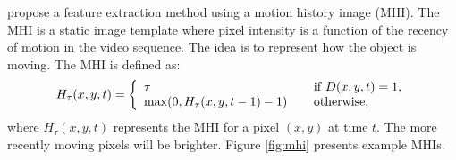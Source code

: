  propose a feature extraction method using
a motion history image (MHI). The MHI is a static image template where pixel
intensity is a function of the recency of motion in the video
sequence. The idea is to represent how the object is moving. The MHI
is defined as:
\[
  \begin{array}{ll}
    H_\tau (x,y,t) = \left\{ 
    \begin{array}{l}
      \tau \\ 
      \max (0, H_\tau (x, y, t - 1) - 1)
    \end{array} \right.
    &
    \begin{array}{l}
      {\rm if}\;D(x, y, t) = 1, \hfill  \\
      {\rm otherwise}, \hfill 
    \end{array}
  \end{array}
\]
where $H_\tau (x,y,t)$ represents the MHI for a pixel $(x,y)$ at time
$t$. The more recently moving pixels will be
brighter. Figure \ref{fig:mhi} presents example MHIs. 

